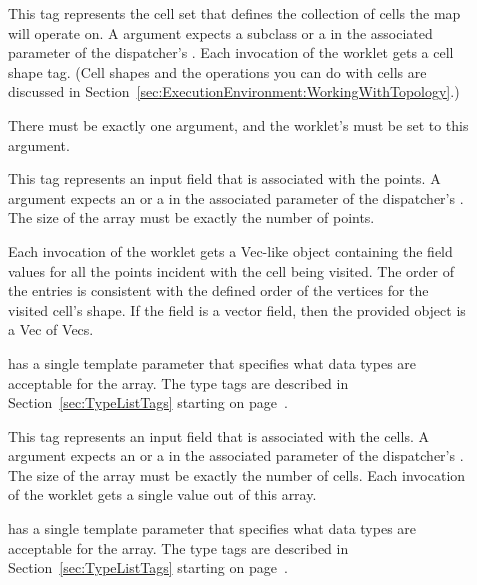 \begin{description}
\item[] This tag represents the cell set that defines
  the collection of cells the map will operate on. A 
  argument expects a  subclass or a
   in the associated parameter of the
  dispatcher's . Each invocation of the worklet gets a
  cell shape tag. (Cell shapes and the operations you can do with cells are
  discussed in Section~\ref{sec:ExecutionEnvironment:WorkingWithTopology}.)

  There must be exactly one  argument, and the worklet's
   must be set to this argument.

\item[] This tag represents an input field that is
  associated with the points. A  argument expects an
   or a  in
  the associated parameter of the dispatcher's . The size
  of the array must be exactly the number of points.

  Each invocation of the worklet gets a Vec-like object containing the
  field values for all the points incident with the cell being visited. The
  order of the entries is consistent with the defined order of the vertices
  for the visited cell's shape. If the field is a vector field, then the
  provided object is a Vec of Vecs.

   has a single template parameter that specifies what
  data types are acceptable for the array. The type tags are described in
  Section~\ref{sec:TypeListTags} starting on page~\pageref{TypeTagList}.

\item[] This tag represents an input field that is
  associated with the cells. A  argument expects an
   or a  in
  the associated parameter of the dispatcher's . The size
  of the array must be exactly the number of cells. Each invocation of the
  worklet gets a single value out of this array.

   has a single template parameter that specifies what
  data types are acceptable for the array. The type tags are described in
  Section~\ref{sec:TypeListTags} starting on page~\pageref{TypeTagList}.


\end{description}
